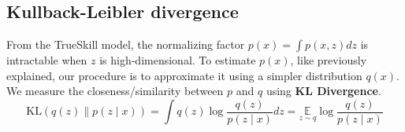 \subsection{Kullback-Leibler divergence}
From the TrueSkill model, the normalizing factor $p(x)=\int p(x,z)dz$ is intractable when $z$ is high-dimensional. To estimate $p(x)$, like previously explained, our procedure is to approximate it using a simpler distribution $q(x)$. We measure the closeness/similarity between $p$ and $q$ using \textbf{KL Divergence}.
$$\mathrm{KL}(q(z) \| p(z \mid x))=\int q(z) \log \frac{q(z)}{p(z \mid x)} d z=\underset{z \sim q}{\mathbb{E}} \log \frac{q(z)}{p(z \mid x)}$$